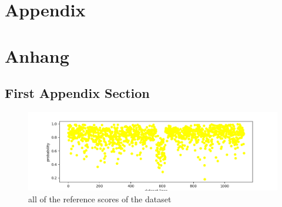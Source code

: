 
{\chapter{Appendix}}    %
{\chapter{Anhang}}      %
\label{chap:appendix}


\section{First Appendix Section}
\label{sec:appendix:FirstSection}
		
\setcounter{figure}{0}

\begin{figure}[ht]
    \centering
    \includegraphics[width=\linewidth]{Latex/sections/images/referencesscatterplot.png}
    \caption{all of the reference scores of the dataset}
    \label{fig:reference scatterplot}
\end{figure}

